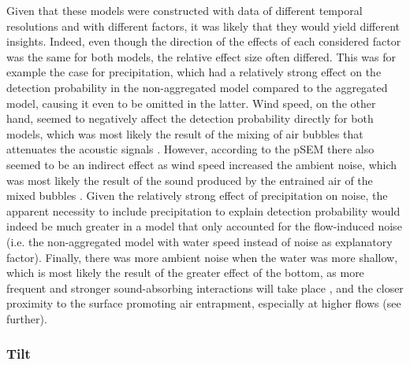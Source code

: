 \documentclass[doublespacing,linenumbers]{bmcart}
\begin{document}
Given that these models were constructed with data of different temporal resolutions and with different factors, it was likely that they would yield different insights. Indeed, even though the direction of the effects of each considered factor was the same for both models, the relative effect size often differed. This was for example the case for precipitation, which had a relatively strong effect on the detection probability in the non-aggregated model compared to the aggregated model, causing it even to be omitted in the latter. Wind speed, on the other hand, seemed to negatively affect the detection probability directly for both models, which was most likely the result of the mixing of air bubbles that attenuates the acoustic signals \cite{Medwin1998FundamentalsOceanography}. However, according to the pSEM there also seemed to be an indirect effect as wind speed increased the ambient noise, which was most likely the result of the sound produced by the entrained air of the mixed bubbles \cite{Medwin1998FundamentalsOceanography}. Given the relatively strong effect of precipitation on noise, the apparent necessity to include precipitation to explain detection probability would indeed be much greater in a model that only accounted for the flow-induced noise (i.e. the non-aggregated model with water speed instead of noise as explanatory factor). %
Finally, there was more ambient noise when the water was more shallow, which is most likely the result of the greater effect of the bottom, as more frequent and stronger sound-absorbing interactions will take place \cite{Katsnelson2012FundamentalsSeries}, and the closer proximity to the surface promoting air entrapment, especially at higher flows (see further). 

\subsubsection*{Tilt}
\end{document}
